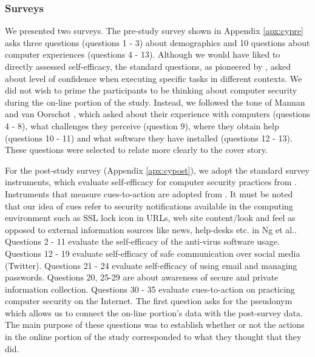\documentclass[doctor]{thesis} %
\theoremstyle{plain}
\begin{document}
\subsubsection*{Surveys}
We presented two surveys. The pre-study survey shown in Appendix \ref{apx:cypre} asks three questions (questions 1 - 3) about demographics and 10 questions about computer experiences (questions 4 - 13). Although we would have liked to directly assessed self-efficacy, the standard questions, as pioneered by \cite{ng2007, claar2010}, asked about level of confidence when executing specific tasks in different contexts. We did not wish to prime the participants to be thinking about computer security during the on-line portion of the study. Instead, we followed the tone of Mannan and van Oorschot \cite{mannan2008}, which asked about their experience with computers (questions 4 - 8), what challenges they perceive (question 9), where they obtain help (questions 10 - 11) and what software they have installed (questions 12 - 13). These questions were selected to relate more clearly to the cover story.

For the post-study survey (Appendix \ref{apx:cypost}), we adopt the standard survey instruments, which evaluate self-efficacy for computer security practices from \cite{ng2007, compeau1995}. Instruments that measure cues-to-action are adopted from \cite{ng2007}. It must be noted that our idea of cues refer to security notifications available in the computing environment such as SSL lock icon in URLs, web site content/look and feel as opposed to external information sources like news, help-desks etc. in Ng et al.\cite{ng2007}. Questions 2 - 11 evaluate the self-efficacy of the anti-virus software usage. Questions 12 - 19 evaluate self-efficacy of safe communication over social media (Twitter). Questions 21 - 24 evaluate self-efficacy of using email and managing passwords. Questions 20, 25-29 are about awareness of secure and private information collection. Questions 30 - 35 evaluate cues-to-action on practicing computer security on the Internet. The first question asks for the pseudonym which allows us to connect the on-line portion's data with the post-survey data. The main purpose of these questions was to establish whether or not the actions in the online portion of the study corresponded to what they thought that they did.
\end{document}
